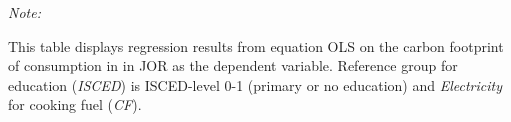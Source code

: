 \begin{table}[htbp!]
\begin{adjustbox}{width = 1\textwidth, max height = 0.95\textheight, center}
\begin{threeparttable}[b]
         \begin{tablenotes}\item \medskip \textit{Note:}
            \item This table displays regression results from equation OLS on the carbon footprint of consumption in  in JOR as the dependent variable.  Reference group for education (\textit{ISCED}) is ISCED-level 0-1 (primary or no education) and \textit{Electricity} for cooking fuel (\textit{CF}).
         \end{tablenotes}
      \end{threeparttable}
   \end{adjustbox}
\end{table}


